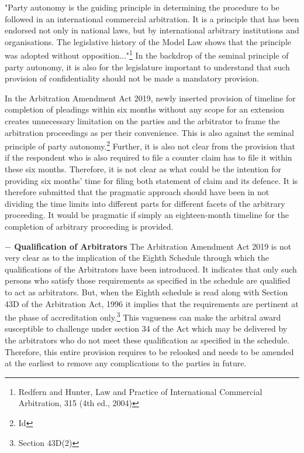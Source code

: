 \begin{multicols}{2}
\noi
"Party autonomy is the guiding principle in determining the procedure to be followed in an
international commercial arbitration. It is a principle that has been endorsed not only in
national laws, but by international arbitrary institutions and organisations. The legislative
history of the Model Law shows that the principle was adopted without opposition..."\footnote{Redfern and Hunter, Law and Practice of International Commercial Arbitration, 315 (4th ed., 2004)}
In the backdrop of the seminal principle of party autonomy, it is also for the legislature
important to understand that such provision of confidentiality should not be made a
mandatory provision.


\noi
In the Arbitration Amendment Act 2019, newly inserted provision of timeline for completion
of pleadings within six months without any scope for an extension creates unnecessary
limitation on the parties and the arbitrator to frame the arbitration proceedings as per their
convenience. This is also against the seminal principle of party autonomy.\footnote{Id} Further, it is also
not clear from the provision that if the respondent who is also required to file a counter claim
has to file it within these six months. Therefore, it is not clear as what could be the intention
for providing six months’ time for filing both statement of claim and its defence. It is
therefore submitted that the pragmatic approach should have been in not dividing the time
limits into different parts for different facets of the arbitrary proceeding. It would be
pragmatic if simply an eighteen-month timeline for the completion of arbitrary proceeding is
provided.

\noi
{\large \bfseries $-$ Qualification of Arbitrators}
The Arbitration Amendment Act 2019 is not very clear as to the implication of the Eighth
Schedule through which the qualifications of the Arbitrators have been introduced. It
indicates that only such persons who satisfy those requirements as specified in the schedule
are qualified to act as arbitrators. But, when the Eighth schedule is read along with Section
43D of the Arbitration Act, 1996 it implies that the requirements are pertinent at the phase of accreditation only.\footnote{Section 43D(2)} This vagueness can make the arbitral award susceptible to challenge
under section 34 of the Act which may be delivered by the arbitrators who do not meet these
qualification as specified in the schedule. Therefore, this entire provision requires to be relooked and needs to be amended at the earliest to remove any complications to the parties in future.


\end{multicols}
